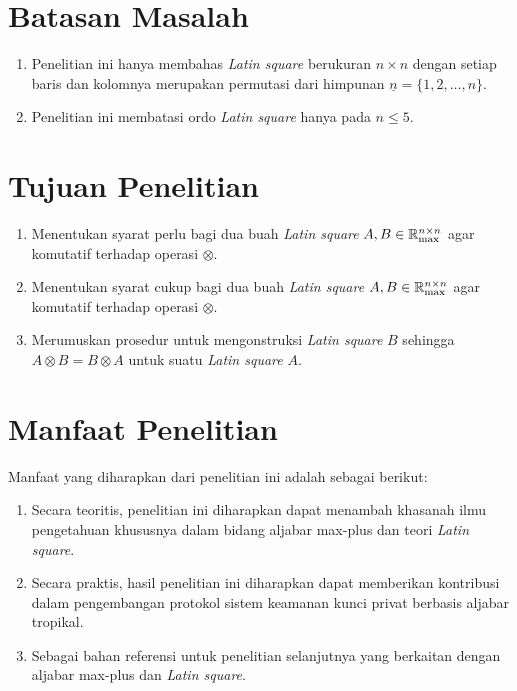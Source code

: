 \section{Batasan Masalah}
\begin{enumerate}
  \item Penelitian ini hanya membahas \textit{Latin square} berukuran $n\times n$ dengan setiap baris dan kolomnya merupakan permutasi dari himpunan $\underline{n}=\{1,2,\ldots,n\}$.
  \item Penelitian ini membatasi ordo \textit{Latin square} hanya pada $n \leq 5$.
\end{enumerate}

\section{Tujuan Penelitian}
\begin{enumerate}
  \item Menentukan syarat perlu bagi dua buah \textit{Latin square} $A,B\in\mathbb{R}^{n\times n}_{\max}$ agar komutatif terhadap operasi $\otimes$.
  \item Menentukan syarat cukup bagi dua buah \textit{Latin square} $A,B\in\mathbb{R}^{n\times n}_{\max}$ agar komutatif terhadap operasi $\otimes$.
  \item Merumuskan prosedur untuk mengonstruksi \textit{Latin square} $B$ sehingga $A \otimes B = B \otimes A$ untuk suatu \textit{Latin square} $A$.
\end{enumerate}


\section{Manfaat Penelitian}
Manfaat yang diharapkan dari penelitian ini adalah sebagai berikut:
\begin{enumerate}
  \item Secara teoritis, penelitian ini diharapkan dapat menambah khasanah ilmu pengetahuan khususnya dalam bidang aljabar max-plus dan teori \textit{Latin square}.
  \item Secara praktis, hasil penelitian ini diharapkan dapat memberikan kontribusi dalam pengembangan protokol sistem keamanan kunci privat berbasis aljabar tropikal.
  \item Sebagai bahan referensi untuk penelitian selanjutnya yang berkaitan dengan aljabar max-plus dan \textit{Latin square}.
\end{enumerate}

